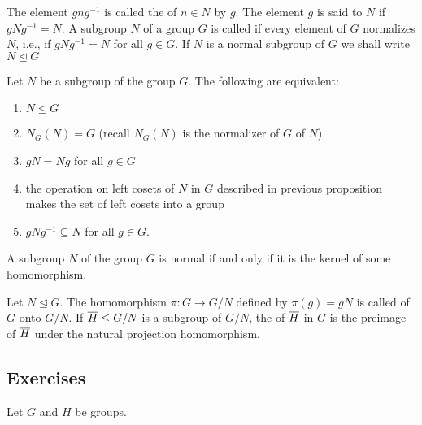 \documentclass[10pt,a4paper]{report}
\begin{document}
\newcommand{\NORMAL}{\trianglelefteq}
\begin{definition}The element $gng^{-1}$ is called the  of $n \in N$ by $g$.  The element $g$ is said to  $N$ if $gNg^{-1} = N$.  A subgroup $N$ of a group $G$ is called  if every element of $G$ normalizes $N$, i.e., if $gNg^{-1}=N$ for all $g \in G$.  If $N$ is a normal subgroup of $G$ we shall write $N \NORMAL G$
\end{definition}

\begin{theorem}
Let $N$ be a subgroup of the group $G$.  The following are equivalent:
\begin{enumerate}
	\item $N \NORMAL G$
	\item $N_G(N)=G$ (recall $N_G(N)$ is the normalizer of $G$ of $N$)
	\item $gN=Ng$ for all $g \in G$
	\item the operation on left cosets of $N$ in $G$ described in previous proposition makes the set of left cosets into a group
	\item $gNg^{-1} \subseteq N$ for all $g \in G$.
\end{enumerate}
\end{theorem}

\begin{prop}A subgroup $N$ of the group $G$ is normal if and only if it is the kernel of some homomorphism.
\end{prop}

\begin{definition}Let $N \NORMAL G$.  The homomorphism $\pi: G \to G/N$ defined by $\pi(g)=gN$ is called  of $G$ onto $G/N$.  If $\overline{H} \le G/N$ is a subgroup of $G/N$, the  of $\overline{H}$ in $G$ is the preimage of $\overline{H}$ under the natural projection homomorphism.
\end{definition}

\subsection{Exercises}

Let $G$ and $H$ be groups.
\end{document}
